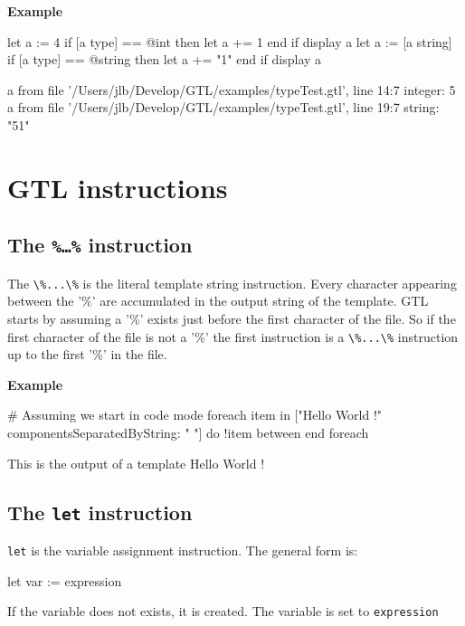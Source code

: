 \documentclass[10pt,openright,twosides,final]{memoir}
\newcommand{\ccst}[1]{{\footnotesize\ttfamily\colorbox{light-blue}{'#1'}}}
\newcommand{\gtlinline}[1]{\colorbox{light-blue}{\lstinline[language=gtl]{#1}}}
\newcommand{\example}{\vspace{.75em}\noindent\textbf{Example}\vspace{0em}}
\begin{document}
\example
\begin{gtl}
let a := 4
if [a type] == @int then
  let a += 1
end if
display a
let a := [a string]
if [a type] == @string then
  let a += "1"
end if
display a
\end{gtl}
\begin{console}
a from file '/Users/jlb/Develop/GTL/examples/typeTest.gtl', line 14:7
    integer: 5
a from file '/Users/jlb/Develop/GTL/examples/typeTest.gtl', line 19:7
    string: "51"
\end{console}

\chapter{GTL instructions}

\section{The \texttt{\%\ldots\%} instruction}

The \gtlinline{\%...\%} is the literal template string instruction. Every character appearing between the \ccst{\%} are accumulated in the output string of the template. GTL starts by assuming a \ccst{\%} exists just before the first character of the file. So if the first character of the file is not a \ccst{\%} the first instruction is a \gtlinline{\%...\%} instruction up to the first \ccst{\%} in the file. 

\example
\begin{gtl}
# Assuming we start in code mode
%
foreach item in ["Hello World !" componentsSeparatedByString: " "]
do
  !item
between%
%
end foreach%
%
\end{gtl}
\begin{templateoutput}
This is the output of a template
Hello
World
!
\end{templateoutput}

\section{The \texttt{let} instruction}

\gtlinline{let} is the variable assignment instruction. The general form is:

\begin{gtl}
let var := expression
\end{gtl}

If the variable does not exists, it is created. The variable is set to \gtlinline{expression}
\end{document}
